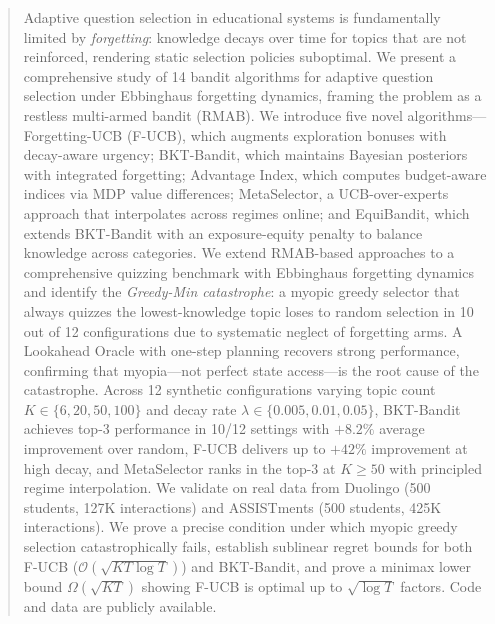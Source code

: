 \begin{abstract}
Adaptive question selection in educational systems is fundamentally limited by \emph{forgetting}: knowledge decays over time for topics that are not reinforced, rendering static selection policies suboptimal.
We present a comprehensive study of 14 bandit algorithms for adaptive question selection under Ebbinghaus forgetting dynamics, framing the problem as a restless multi-armed bandit (RMAB).
We introduce five novel algorithms---Forgetting-UCB (F-UCB), which augments exploration bonuses with decay-aware urgency; BKT-Bandit, which maintains Bayesian posteriors with integrated forgetting; Advantage Index, which computes budget-aware indices via MDP value differences; MetaSelector, a UCB-over-experts approach that interpolates across regimes online; and EquiBandit, which extends BKT-Bandit with an exposure-equity penalty to balance knowledge across categories.
We extend RMAB-based approaches to a comprehensive quizzing benchmark with Ebbinghaus forgetting dynamics and identify the \emph{Greedy-Min catastrophe}: a myopic greedy selector that always quizzes the lowest-knowledge topic loses to random selection in 10 out of 12 configurations due to systematic neglect of forgetting arms.
A Lookahead Oracle with one-step planning recovers strong performance, confirming that myopia---not perfect state access---is the root cause of the catastrophe.
Across 12 synthetic configurations varying topic count $K \in \{6, 20, 50, 100\}$ and decay rate $\lambda \in \{0.005, 0.01, 0.05\}$, BKT-Bandit achieves top-3 performance in 10/12 settings with $+8.2\%$ average improvement over random, F-UCB delivers up to $+42\%$ improvement at high decay, and MetaSelector ranks in the top-3 at $K{\geq}50$ with principled regime interpolation.
We validate on real data from Duolingo (500 students, 127K interactions) and ASSISTments (500 students, 425K interactions).
We prove a precise condition under which myopic greedy selection catastrophically fails, establish sublinear regret bounds for both F-UCB ($\mathcal{O}(\sqrt{KT\log T})$) and BKT-Bandit, and prove a minimax lower bound $\Omega(\sqrt{KT})$ showing F-UCB is optimal up to $\sqrt{\log T}$ factors.
Code and data are publicly available.
\end{abstract}
